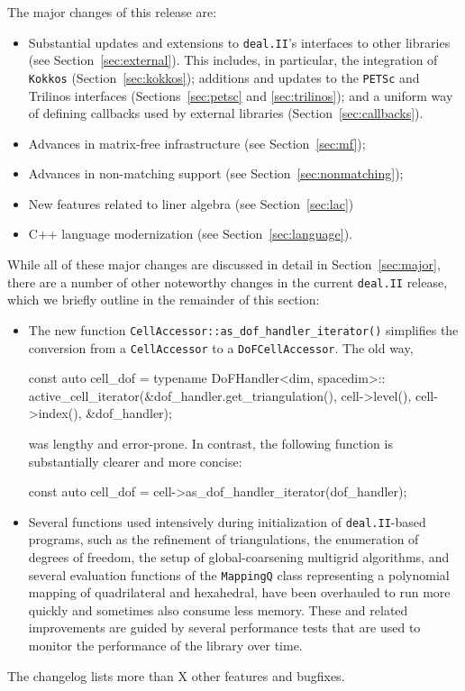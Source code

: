 \documentclass{ansarticle-preprint}
\newcommand{\specialword}[1]{\texttt{#1}}
\newcommand{\dealii}{{\specialword{deal.II}}\xspace}
\begin{document}
The major changes of this release are:
%
\begin{itemize}
  \item Substantial updates and extensions to \dealii{}'s interfaces
    to other libraries (see Section~\ref{sec:external}). This
    includes, in particular, the integration of \texttt{Kokkos} (Section~\ref{sec:kokkos});
    additions and updates to the \texttt{PETSc} and Trilinos
    interfaces
    (Sections~\ref{sec:petsc} and \ref{sec:trilinos}); and a uniform
    way of defining callbacks used by external libraries
    (Section~\ref{sec:callbacks}).
  \item Advances in matrix-free infrastructure (see Section~\ref{sec:mf});
  \item Advances in non-matching support (see Section~\ref{sec:nonmatching});
  \item New features related to liner algebra (see Section~\ref{sec:lac})
  \item C++ language modernization (see Section~\ref{sec:language}).
\end{itemize}
%

While all of these major changes are discussed in detail in
Section~\ref{sec:major}, there
are a number of other noteworthy changes in the current \dealii release,
which we briefly outline in the remainder of this section:
%
\begin{itemize}
  \item The new function \texttt{CellAccessor::as\_dof\_handler\_iterator()}
  simplifies the conversion from a \texttt{Cell\-Accessor} to a \texttt{DoF\-Cell\-Accessor}.
  The old way,
\begin{c++}
const auto cell_dof = typename DoFHandler<dim, spacedim>::
  active_cell_iterator(&dof_handler.get_triangulation(),
    cell->level(), cell->index(), &dof_handler);
\end{c++}
was lengthy and error-prone. In contrast, the following function is
substantially clearer and more concise:
\begin{c++}
const auto cell_dof = cell->as_dof_handler_iterator(dof_handler);
\end{c++}
\item Several functions used intensively during initialization of
  \dealii-based programs, such as the refinement of triangulations, the
  enumeration of degrees of freedom, the setup of global-coarsening multigrid
  algorithms, and several evaluation functions of the \texttt{MappingQ} class
  representing a polynomial mapping of quadrilateral and hexahedral, have been
  overhauled to run more quickly and sometimes also consume less memory. These
  and related improvements are guided by several performance tests that are
  used to monitor the performance of the library over time.
\end{itemize}
%
The changelog lists more than X other features and bugfixes.
\end{document}

